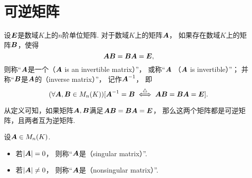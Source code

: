 \section{可逆矩阵}

\begin{definition}\label{definition:可逆矩阵.可逆矩阵的定义}
设\(\boldsymbol{E}\)是数域\(K\)上的\(n\)阶单位矩阵.
对于数域\(K\)上的矩阵\(\boldsymbol{A}\)，
如果存在数域\(K\)上的矩阵\(\boldsymbol{B}\)，使得\begin{equation*}
	\boldsymbol{A}\boldsymbol{B}=\boldsymbol{B}\boldsymbol{A}=\boldsymbol{E},
\end{equation*}
则称“\(\boldsymbol{A}\)是一个（\(\boldsymbol{A}\) is an invertible matrix）”，
或称“\(\boldsymbol{A}\) （\(\boldsymbol{A}\) is invertible）”；
并称“\(\boldsymbol{B}\)是\(\boldsymbol{A}\)的（inverse matrix）”，
记作\(\boldsymbol{A}^{-1}\)，
即\begin{equation*}
	(\forall \boldsymbol{A},\boldsymbol{B}\in M_n(K))
	[\boldsymbol{A}^{-1} = \boldsymbol{B} \overset{\triangle}{\iff} \boldsymbol{A}\boldsymbol{B}=\boldsymbol{B}\boldsymbol{A}=\boldsymbol{E}].
\end{equation*}
\end{definition}

从定义可知，如果矩阵\(\boldsymbol{A},\boldsymbol{B}\)满足\(\boldsymbol{A}\boldsymbol{B}=\boldsymbol{B}\boldsymbol{A}=\boldsymbol{E}\)，
那么这两个矩阵都是可逆矩阵，且两者互为逆矩阵.

\begin{definition}
设\(\boldsymbol{A} \in M_n(K)\).
\begin{itemize}
	\item 若\(\abs{\boldsymbol{A}}=0\)，
	则称“\(\boldsymbol{A}\)是（singular matrix）”.
	\item 若\(\abs{\boldsymbol{A}} \neq 0\)，
	则称“\(\boldsymbol{A}\)是（nonsingular matrix）”.
\end{itemize}
\end{definition}

